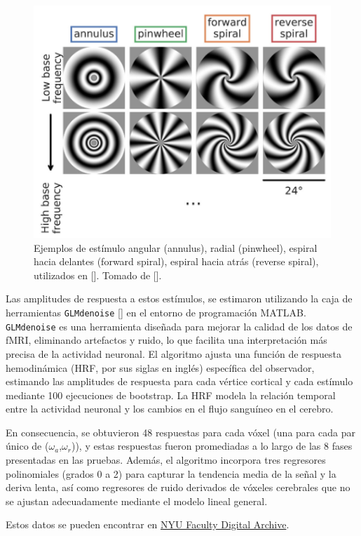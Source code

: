 \begin{figure}
	\centering
	\includegraphics[scale=0.8]{Graphics/stimulus}
	\caption{Ejemplos de est\'imulo angular (annulus), radial (pinwheel), espiral hacia delantes (forward spiral), espiral hacia atr\'as (reverse spiral), utilizados en [\cite{broderick_mapping_2022}]. Tomado de [\cite{broderick_mapping_2022}].}
	\label{fig:stim}
\end{figure}
Las amplitudes de respuesta a estos estímulos, se estimaron utilizando la caja de herramientas \texttt{GLMdenoise} [\cite{kay_glmdenoise_2013}] en el entorno de programación MATLAB. \texttt{GLMdenoise} es una herramienta diseñada para mejorar la calidad de los datos de fMRI, eliminando artefactos y ruido, lo que facilita una interpretación más precisa de la actividad neuronal. El algoritmo ajusta una función de respuesta hemodinámica (HRF, por sus siglas en ingl\'es) específica del observador, estimando las amplitudes de respuesta para cada v\'ertice cortical y cada estímulo mediante 100 ejecuciones de bootstrap. La HRF modela la relación temporal entre la actividad neuronal y los cambios en el flujo sanguíneo en el cerebro.

En consecuencia, se obtuvieron 48 respuestas para cada vóxel (una para cada par único de ($\omega_a$,$\omega_r$)), y estas respuestas fueron promediadas a lo largo de las 8 fases presentadas en las pruebas. Además, el algoritmo incorpora tres regresores polinomiales (grados 0 a 2) para capturar la tendencia media de la señal y la deriva lenta, así como regresores de ruido derivados de vóxeles cerebrales que no se ajustan adecuadamente mediante el modelo lineal general. 

Estos datos se pueden encontrar en \href{https://archive.nyu.edu/handle/2451/63344}{NYU Faculty Digital Archive}.

